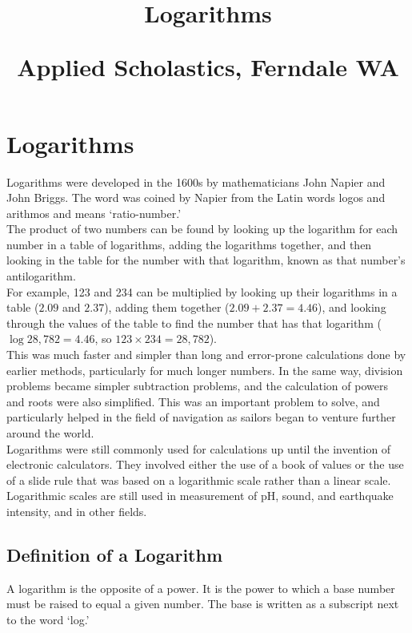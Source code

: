 \documentclass{article}
\author{}
\date{}
\title{Logarithms\\
\vspace{28pt}
\begin{normalsize}Applied Scholastics, Ferndale WA \end{normalsize}}
\begin{document}
\maketitle
\pagebreak
\tableofcontents
\pagebreak

\section{Logarithms}
Logarithms were developed in the 1600s by mathematicians John Napier and John Briggs. The word was coined by Napier from the Latin words logos and arithmos and means ‘ratio-number.’\\

The product of two numbers can be found by looking up the logarithm for each number in a table of logarithms, adding the logarithms together, and then looking in the table for the number with that logarithm, known as that number’s antilogarithm.\\

For example, 123 and 234 can be multiplied by looking up their logarithms in a table ($2.09$ and $2.37$), adding them together ($2.09+2.37=4.46$), and looking through the values of the table to find the number that has that logarithm ($\log {28,782}=4.46$, so $123 \times 234=28,782$).\\

This was much faster and simpler than long and error-prone calculations done by earlier methods, particularly for much longer numbers. In the same way, division problems became simpler subtraction problems, and the calculation of powers and roots were also simplified. This was an important problem to solve, and particularly helped in the field of navigation as sailors began to venture further around the world.\\

Logarithms were still commonly used for calculations up until the invention of electronic calculators. They involved either the use of a book of values or the use of a slide rule that was based on a logarithmic scale rather than a linear scale.  Logarithmic scales are still used in measurement of pH, sound, and earthquake intensity, and in other fields.

\subsection*{Definition of a Logarithm}
A logarithm is the opposite of a power. It is the power to which a base number must be raised to equal a given number. The base is written as a subscript next to the word ‘log.’
\end{document}
